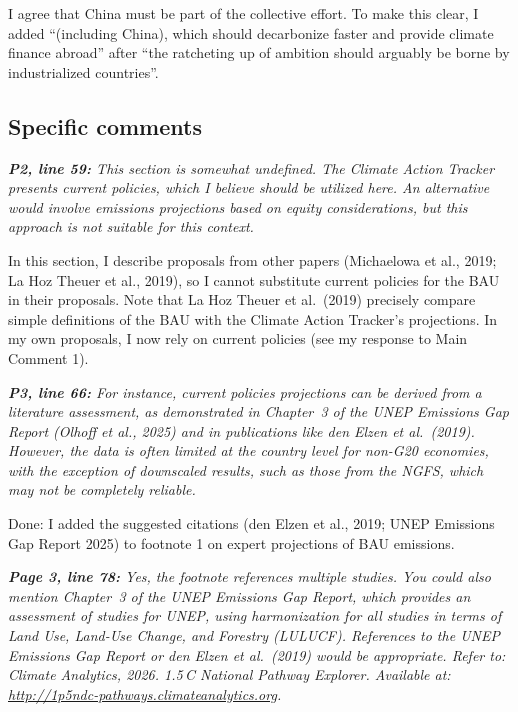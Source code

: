 \documentclass[11pt]{article}
\newenvironment{italic}{\itshape}{\par}
\begin{document}
I agree that China must be part of the collective effort. To make this clear, I added ``(including China), which should decarbonize faster and provide climate finance abroad'' after ``the ratcheting up of ambition should arguably be borne by industrialized countries''.



\subsection*{Specific comments}

\begin{italic}
\textbf{P2, line 59:} This section is somewhat undefined. The Climate Action Tracker presents current policies, which I believe should be utilized here. An alternative would involve emissions projections based on equity considerations, but this approach is not suitable for this context.
\end{italic}

In this section, I describe proposals from other papers (Michaelowa et al., 2019; La Hoz Theuer et al., 2019), so I cannot substitute current policies for the BAU in their proposals. Note that La Hoz Theuer et al.\ (2019) precisely compare simple definitions of the BAU with the Climate Action Tracker's projections. In my own proposals, I now rely on current policies (see my response to Main Comment 1).




\begin{italic}
\textbf{P3, line 66:} For instance, current policies projections can be derived from a literature assessment, as demonstrated in Chapter~3 of the UNEP Emissions Gap Report (Olhoff et al., 2025) and in publications like den Elzen et al.\ (2019). However, the data is often limited at the country level for non-G20 economies, with the exception of downscaled results, such as those from the NGFS, which may not be completely reliable.
\end{italic}


Done: I added the suggested citations (den Elzen et al., 2019; UNEP Emissions Gap Report 2025) to footnote 1 on expert projections of BAU emissions.



\begin{italic}
\textbf{Page 3, line 78:} Yes, the footnote references multiple studies. You could also mention Chapter~3 of the UNEP Emissions Gap Report, which provides an assessment of studies for UNEP, using harmonization for all studies in terms of Land Use, Land-Use Change, and Forestry (LULUCF). References to the UNEP Emissions Gap Report or den Elzen et al.\ (2019) would be appropriate. Refer to: Climate Analytics, 2026. \emph{1.5\,\textdegree C National Pathway Explorer}. Available at: \url{http://1p5ndc-pathways.climateanalytics.org}.
\end{italic}
\end{document}
